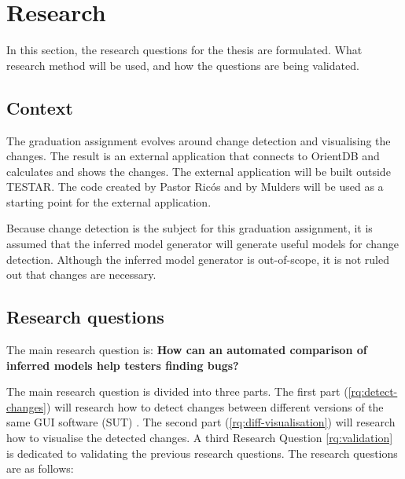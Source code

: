 \section{Research} \label{questions}
In this section, the research questions for the thesis are formulated. What research method will be used, and how the questions are being validated.

\subsection{Context}
The graduation assignment evolves around change detection and visualising the changes. The result is an external application that connects to OrientDB and calculates and shows the changes. The external application will be built outside TESTAR. The code created by Pastor Ricós and by Mulders will be used as a starting point for the external application. 

Because change detection is the subject for this graduation assignment, it is assumed that the inferred model generator will generate useful models for change detection. Although the inferred model generator is out-of-scope, it is not ruled out that changes are necessary.

\subsection{Research questions} \label{research-questions}
        
The main research question is: \textbf{How can an automated comparison of inferred models help testers finding bugs?}

The main research question is divided into three parts. The first part (\ref{rq:detect-changes}) will research how to detect changes between different versions of the same GUI software (SUT) \cite{testar-todo}. The second part (\ref{rq:diff-visualisation}) will research how to visualise the detected changes. A third Research Question \ref{rq:validation} is dedicated to validating the previous research questions. The research questions are as follows: 


